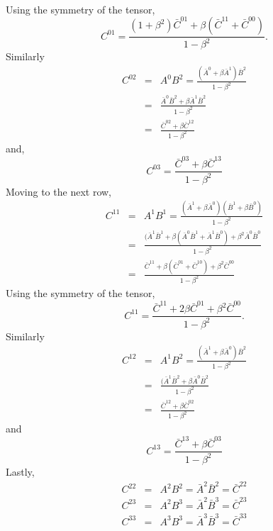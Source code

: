 \begin{enumerate}
\begin{eqnarray*}
\end{eqnarray*}
Using the symmetry of the tensor,
\begin{equation}\label{c1e89}
C^{01} = 
\frac{(1 + \beta^2)\bar{C}^{01} + \beta(\bar{C}^{11} + \bar{C}^{00})}
{1 - \beta^2}.
\end{equation}
Similarly
\begin{eqnarray}
C^{02} 
 &=& A^0 B^2 = 
     \frac{(\bar{A}^0 + \beta\bar{A}^1)\bar{B}^2}{1 - \beta^2} \nonumber \\
 &=& \frac{\bar{A}^0\bar{B}^2 + \beta\bar{A}^1\bar{B}^2}
      {1 - \beta^2} \nonumber \\
 &=& \frac{\bar{C}^{02} + \beta\bar{C}^{12}}{1 - \beta^2} \label{c1e90}
\end{eqnarray}
and,
\begin{equation}\label{c1e91}
C^{03} = \frac{\bar{C}^{03} + \beta\bar{C}^{13}}{1 - \beta^2}
\end{equation}
Moving to the next row,
\begin{eqnarray*}
C^{11} &=& 
 A^1 B^1 = 
 \frac{(\bar{A}^1 + \beta\bar{A}^0)(\bar{B}^1 + \beta\bar{B}^0)}{1 - \beta^2}\\
 &=& \frac{(\bar{A}^1\bar{B}^1 + \beta(\bar{A}^0\bar{B}^1 + 
          \bar{A}^1\bar{B}^0) + \beta^2\bar{A}^0\bar{B}^0}{1 - \beta^2} \\
 &=& \frac{\bar{C}^{11} + \beta(\bar{C}^{01} + \bar{C}^{10}) + 
           \beta^2\bar{C}^{00}}{1 - \beta^2}
\end{eqnarray*}
Using the symmetry of the tensor,
\begin{equation}\label{c1e92}
C^{11} = 
\frac{\bar{C}^{11} + 2\beta\bar{C}^{01} + \beta^2\bar{C}^{00}}{1 - \beta^2}.
\end{equation}
Similarly
\begin{eqnarray}
C^{12} &=& 
A^1 B^2 = \frac{(\bar{A}^1 + \beta\bar{A}^0)\bar{B}^2}{1 - \beta^2} \nonumber\\
&=&\frac{(\bar{A}^1\bar{B}^2+\beta\bar{A}^0\bar{B}^2}{1 - \beta^2} \nonumber \\
&=& \frac{\bar{C}^{12} + \beta\bar{C}^{02}}{1 - \beta^2} \label{c1e93}
\end{eqnarray}
and
\begin{equation}\label{c1e94}
C^{13} = \frac{\bar{C}^{13} + \beta\bar{C}^{03}}{1 - \beta^2} 
\end{equation}
Lastly, 
\begin{eqnarray}
C^{22} &=& A^2B^2 = \bar{A}^2\bar{B}^2 = \bar{C}^{22} \label{c1e95} \\
C^{23} &=& A^2B^3 = \bar{A}^2\bar{B}^3 = \bar{C}^{23} \label{c1e96} \\
C^{33} &=& A^3B^3 = \bar{A}^3\bar{B}^3 = \bar{C}^{33} \label{c1e97}
\end{eqnarray}


\end{enumerate}
